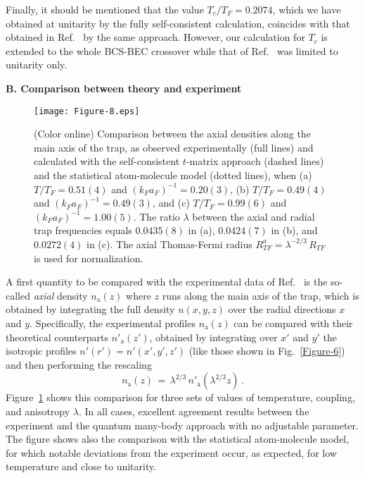\documentclass[pra,twocolumn,aps,amssymb,showpacs,superscriptaddress]{revtex4-1}
\begin{document}
Finally, it should be mentioned that the value $T_{c}/T_{F} = 0.2074$, which we have obtained at unitarity by the fully self-consistent calculation, coincides with that obtained in Ref.~\cite{Haussmann-2008} by the same approach.
However, our calculation for $T_{c}$ is extended to the whole BCS-BEC crossover while that of Ref.~\cite{Haussmann-2008} was limited to unitarity only.

\vspace{0.05cm}
\begin{center}
{\bf B. Comparison between theory and experiment}
\end{center}

\begin{figure}[t]
\begin{center}
\texttt{[image: Figure-8.eps]}
\caption{(Color online) Comparison between the axial densities along the main axis of the trap, as observed experimentally (full lines) and calculated with the self-consistent $t$-matrix approach 
                                    (dashed lines) and the statistical atom-molecule model (dotted lines), when (a) $T/T_{F} = 0.51(4)$ and $(k_{F} a_{F})^{-1} = 0.20(3)$, (b) $T/T_{F} = 0.49(4)$ and 
                                    $(k_{F} a_{F})^{-1} = 0.49(3)$, and (c) $T/T_{F} = 0.99(6)$ and $(k_{F} a_{F})^{-1} = 1.00(5)$. 
                                     The ratio $\lambda$ between the axial and radial trap frequencies equals $0.0435(8)$ in (a), $0.0424(7)$ in (b), and $0.0272(4)$ in (c).
                                     The axial Thomas-Fermi radius $R^a_{TF}= \lambda^{-2/3} \, R_{TF}$ is used for normalization.}
\label{Figure-8}
\end{center}
\end{figure} 


A first quantity to be compared with the experimental data of Ref.~\cite{Ulm-Cam-2019} is the so-called \emph{axial} density $n_{\mathrm{a}}(z)$ where $z$ runs along the main axis of the trap, 
which is obtained by integrating the full density $n(x,y,z)$ over the radial directions $x$ and $y$.
Specifically, the experimental profiles $n_{\mathrm{a}}(z)$ can be compared with their theoretical counterparts $n'_{\mathrm{a}}(z')$, obtained by integrating over $x'$ and $y'$ the isotropic profiles $n'(r') = n'(x',y',z')$ (like those shown in Fig.~\ref{Figure-6}) and then performing the rescaling
\begin{equation}
n_{\mathrm{a}}(z) \, = \, \lambda^{2/3} \, n'_{\mathrm{a}}(\lambda^{2/3} z) \, .
\label{rescaling}
\end{equation} 
Figure~\ref{Figure-8} shows this comparison for three sets of values of temperature, coupling, and anisotropy $\lambda$.
In all cases, excellent agreement results between the experiment and the quantum many-body approach with no adjustable parameter.
The figure shows also the comparison with the statistical atom-molecule model, for which notable deviations from the experiment occur, as expected, for low temperature and close to unitarity.
\end{document}

